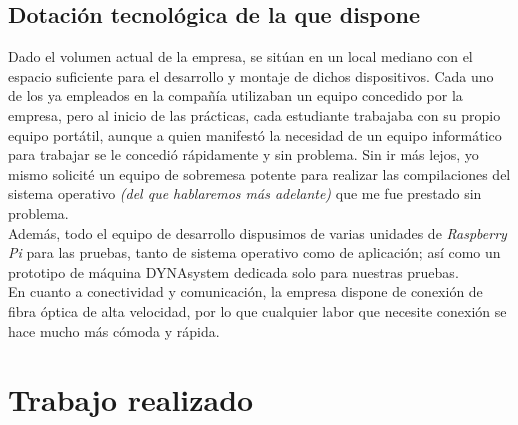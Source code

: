 \documentclass[13pt]{scrartcl}
\begin{document}
		\subsection{Dotación tecnológica de la que dispone}
			Dado el volumen actual de la empresa, se sitúan en un local mediano con el espacio suficiente para el desarrollo y montaje de dichos dispositivos. Cada uno de los ya empleados en la compañía utilizaban un equipo concedido por la empresa, pero al inicio de las prácticas, cada estudiante trabajaba con su propio equipo portátil, aunque a quien manifestó la necesidad de un equipo informático para trabajar se le concedió rápidamente y sin problema. Sin ir más lejos, yo mismo solicité un equipo de sobremesa potente para realizar las compilaciones del sistema operativo \textit{(del que hablaremos más adelante)} que me fue prestado sin problema.\\
			
			Además, todo el equipo de desarrollo dispusimos de varias unidades de \textit{Raspberry Pi} para las pruebas, tanto de sistema operativo como de aplicación; así como un prototipo de máquina DYNAsystem dedicada solo para nuestras pruebas.\\
			
			En cuanto a conectividad y comunicación, la empresa dispone de conexión de fibra óptica de alta velocidad, por lo que cualquier labor que necesite conexión se hace mucho más cómoda y rápida.
	
	\section{Trabajo realizado}
	
\end{document}

